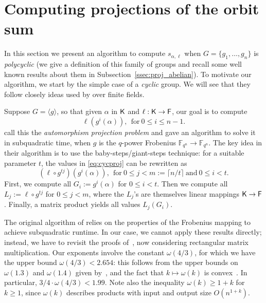 \section{Computing projections of the orbit sum}
\label{sec:osum}

In this section we present an algorithm to compute $s_{\alpha,\ell}$
when $G=\{g_1,\dots,g_n\}$ is {\em polycyclic} (we give a definition
of this family of groups and recall some well known results about them
in Subsection~\ref{ssec:proj_abelian}). To motivate our algorithm,
we start by the simple case of a {\em cyclic} group.  We will see that
they follow closely ideas used by \cite{KalSho98} over finite fields.

Suppose $G = \langle g \rangle$, so that given $\alpha$ in ${\mathsf{K}}$ and
$\ell: {\mathsf{K}} \to {\mathsf{F}}$, our goal is to compute
\begin{equation}
  \label{eq:cycproj}
  \ell(g^i(\alpha)), ~~\mbox{for}~ 0\leq i\leq n-1.
\end{equation}
\cite{KalSho98} call this the \emph{automorphism projection problem} and
gave an algorithm to solve it in subquadratic time, when $g$ is the
$q$-power Frobenius $\mathbb{F}_{q^n} \to \mathbb{F}_{q^n}$.  The key idea in their
algorithm is to use the baby-steps/giant-steps technique: for a suitable
parameter $t$, the values in \eqref{eq:cycproj} can be rewritten as
\[
  (\ell \circ g^{tj})(g^i(\alpha)), ~~\mbox{for}~ 0 \leq j < m:=\lceil n/t
  \rceil ~\mbox{and}~ 0 \leq i <t.
\]
First, we compute all $G_i:=g^i(\alpha)$ for $0 \leq i <t$.  Then we compute
all $L_j:=\ell \circ g^{tj}$ for $0 \leq j <m$, where the $L_j$'s are
themselves linear mappings ${\mathsf{K}} \to {\mathsf{F}}$.  Finally, a matrix product yields
all values $L_j(G_i)$.

The original algorithm of \cite{KalSho98} relies on the properties of
the Frobenius mapping to achieve subquadratic runtime. In our case, we
cannot apply these results directly; instead, we have to revisit the
proofs of~\cite[Lemmata 3 and 4]{KalSho98}, now considering
rectangular matrix multiplication.  Our exponents involve the constant
$\omega(4/3)$, for which we have the upper bound $\omega(4/3) <
2.654$: this follows from the upper bounds on $\omega(1.3)$ and
$\omega(1.4)$ given by~\cite{LeGall}, and the fact that $k \mapsto
\omega(k)$ is convex~\citep{LoRo83}. In particular, $3/4 \cdot
\omega(4/3) < 1.99$. Note also the inequality $\omega(k) \ge 1+k$ for
$k\ge 1$, since $\omega(k)$ describes products with input and output
size $O(n^{1+k})$.


